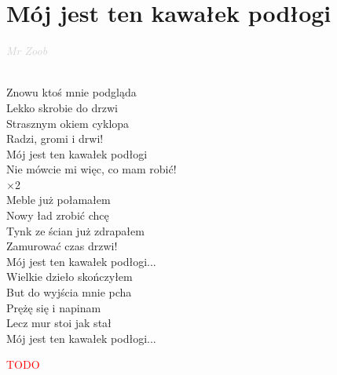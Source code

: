 \documentclass[a5paper, 10pt]{book}
\begin{document}
\section{Mój jest ten kawałek podłogi}\textcolor{lightgray}{\textit{Mr Zoob}}\\~\\
\begin{minipage}[t]{0.8\textwidth}
Znowu ktoś mnie podgląda\\
Lekko skrobie do drzwi\\
Strasznym okiem cyklopa\\
Radzi, gromi i drwi!\\

\hspace*{5mm}Mój jest ten kawałek podłogi\\
\hspace*{5mm}Nie mówcie mi więc, co mam robić!\\
\hspace*{5mm}\hspace*{20mm}$\times $2\\

Meble już połamałem\\
Nowy ład zrobić chcę\\
Tynk ze ścian już zdrapałem\\
Zamurować czas drzwi!\\

\hspace*{5mm}Mój jest ten kawałek podłogi...\\

Wielkie dzieło skończyłem\\
But do wyjścia mnie pcha\\
Prężę się i napinam\\
Lecz mur stoi jak stał\\

\hspace*{5mm}Mój jest ten kawałek podłogi...\\
\end{minipage}
\begin{minipage}[t]{0.2\textwidth}
\textcolor{red}{TODO}\\
\end{minipage}

\newpage
\end{document}
